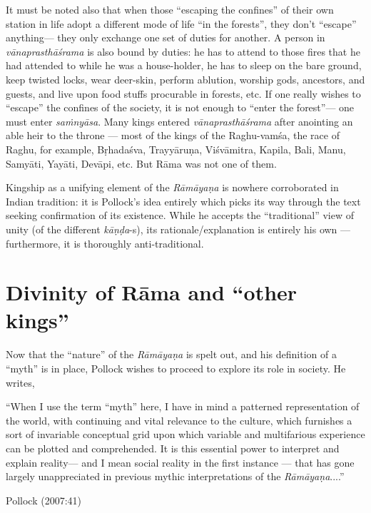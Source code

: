 It must be noted also that when those “escaping the confines” of their own station in life adopt a different mode of life “in the forests”, they don’t “escape” anything--- they only exchange one set of duties for another. A person in {\sl vānaprasthāśrama} is also bound by duties: he has to attend to those fires that he had attended to while he was a house-holder, he has to sleep on the bare ground, keep twisted locks, wear deer-skin, perform ablution, worship gods, ancestors, and guests, and live upon food stuffs procurable in forests, etc. If one really wishes to “escape” the confines of the society, it is not enough to “enter the forest”--- one must enter {\sl saṁnyāsa}. Many kings entered {\sl vānaprasthāśrama} after anointing an able heir to the throne --- most of the kings of the Raghu-vamśa, the race of Raghu, for example, Bṛhadaśva, Trayyāruṇa, Viśvāmitra, Kapila, Bali, Manu, Samyāti, Yayāti, Devāpi, etc. But Rāma was not one of them. 

Kingship as a unifying element of the {\sl Rāmāyaṇa} is nowhere corroborated in Indian tradition: it is Pollock’s idea entirely which picks its way through the text seeking confirmation of its existence. While he accepts the “traditional” view of unity (of the different \hbox{{\sl kāṇḍa}-s}), its rationale/explanation is entirely his own --- furthermore, it is thoroughly anti-traditional.

\section{Divinity of Rāma and “other kings”}\label{sec2.4}

Now that the “nature” of the {\sl Rāmāyaṇa} is spelt out, and his definition of a “myth” is in place, Pollock wishes to proceed to explore its role in society. He writes, 

\begin{myquote}
“When I use the term “myth” here, I have in mind a patterned representation of the world, with continuing and vital relevance to the culture, which furnishes a sort of invariable conceptual grid upon which variable and multifarious experience can be plotted and comprehended. It is this essential power to interpret and explain reality--- and I mean social reality in the first instance --- that has gone largely unappreciated in previous mythic interpretations of the {\sl Rāmāyaṇa}....” 

\hfill Pollock (2007:41)
\end{myquote}

